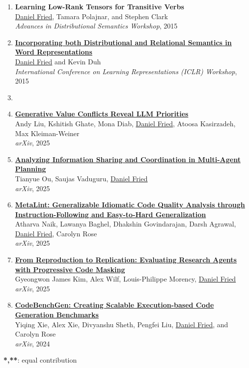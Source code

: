 \begin{enumerate}[leftmargin=-1mm,partopsep=0pt]
\item \textbf{Learning Low-Rank Tensors for Transitive Verbs} \\
  \underline{Daniel Fried}, Tamara Polajnar, and Stephen Clark\\
  \emph{Advances in Distributional Semantics Workshop}, 2015

\item \href{http://arxiv.org/abs/1412.5836}{\textbf{Incorporating both Distributional and Relational Semantics in Word Representations}} \\
  \underline{Daniel Fried} and Kevin Duh\\
  \emph{International Conference on Learning Representations (ICLR) Workshop}, 2015

\item[]

\item \href{https://arxiv.org/abs/2509.25369}{\textbf{Generative Value Conflicts Reveal LLM Priorities}} \\
  Andy Liu, Kshitish Ghate, Mona Diab, \underline{Daniel Fried}, Atoosa Kasirzadeh, Max Kleiman-Weiner\\
  \emph{arXiv}, 2025

\item \href{https://arxiv.org/abs/2508.12981}{\textbf{Analyzing Information Sharing and Coordination in Multi-Agent Planning}} \\
  Tianyue Ou, Saujas Vaduguru, \underline{Daniel Fried}\\
  \emph{arXiv}, 2025

\item \href{https://arxiv.org/abs/2507.11687}{\textbf{MetaLint: Generalizable Idiomatic Code Quality Analysis through Instruction-Following and Easy-to-Hard Generalization}} \\
  Atharva Naik, Lawanya Baghel, Dhakshin Govindarajan, Darsh Agrawal, \underline{Daniel Fried}, Carolyn Rose\\
  \emph{arXiv}, 2025

\item \href{https://arxiv.org/abs/2506.19724}{\textbf{From Reproduction to Replication: Evaluating Research Agents with Progressive Code Masking}} \\
  Gyeongwon James Kim, Alex Wilf, Louis-Philippe Morency, \underline{Daniel Fried}\\
  \emph{arXiv}, 2025

\item \href{https://arxiv.org/abs/2404.00566}{\textbf{CodeBenchGen: Creating Scalable Execution-based Code Generation Benchmarks}} \\
  Yiqing Xie, Alex Xie, Divyanshu Sheth, Pengfei Liu, \underline{Daniel Fried}, and Carolyn Rose\\
  \emph{arXiv}, 2024

\end{enumerate}

\textbf{*,**}: equal contribution
